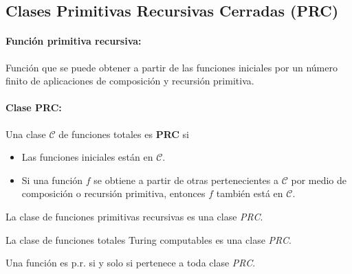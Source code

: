 	\subsection{Clases Primitivas Recursivas Cerradas (PRC)} 
	
	\paragraph{Función primitiva recursiva:} Función que se puede obtener a partir de las funciones iniciales por un número finito de aplicaciones de composición y recursión primitiva.
	
	\paragraph{Clase PRC:}	Una clase $\mathcal{C}$ de funciones totales es \textbf{PRC} si
	\begin{itemize}
		\item Las funciones iniciales están en $\mathcal{C}$.
		\item Si una función $f$ se obtiene a partir de otras pertenecientes a $\mathcal{C}$ por medio de composición o recursión primitiva, entonces $f$ también está en $\mathcal{C}$.
	\end{itemize}

	\begin{corolario}
La clase de funciones primitivas recursivas es una clase \textit{PRC}.
	\end{corolario}
	
	\begin{teorema}
La clase de funciones totales Turing computables es una clase \textit{PRC}.
	\end{teorema}

	\begin{teorema}\label{teorema::funcPrSiEnTodaClasePrc}
Una función es p.r. si y solo si pertenece a toda clase \textit{PRC}.
	\end{teorema}
	

